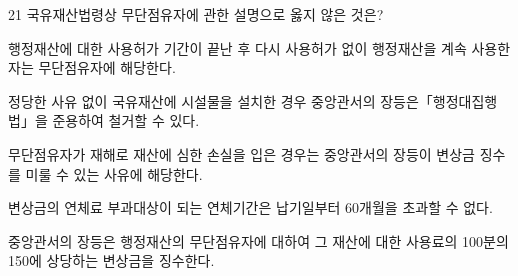 \begin{question}{21}
국유재산법령상 무단점유자에 관한 설명으로 옳지 않은 것은?
\begin{choices}
  \item 행정재산에 대한 사용허가 기간이 끝난 후 다시 사용허가 없이 행정재산을 계속 사용한 자는 무단점유자에 해당한다.
  \item 정당한 사유 없이 국유재산에 시설물을 설치한 경우 중앙관서의 장등은「행정대집행법」을 준용하여 철거할 수 있다.
  \item 무단점유자가 재해로 재산에 심한 손실을 입은 경우는 중앙관서의 장등이 변상금 징수를 미룰 수 있는 사유에 해당한다.
  \item 변상금의 연체료 부과대상이 되는 연체기간은 납기일부터 60개월을 초과할 수 없다.
  \item 중앙관서의 장등은 행정재산의 무단점유자에 대하여 그 재산에 대한 사용료의 100분의 150에 상당하는 변상금을 징수한다.
\end{choices}
\end{question}
